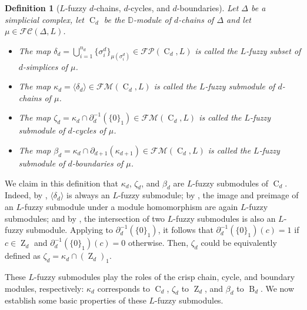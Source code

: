 \documentclass[a4paper,10pt]{article}
\newtheorem{definition}[theorem]{Definition}
\newcommand{\bbd}{\mathbb{D}}
\newcommand{\calfm}{\mathcal{F\!M}}
\newcommand{\calfp}{\mathcal{FP}}
\newcommand{\calfc}{\mathcal{FC}}
\DeclareMathOperator{\Co}{C}
\DeclareMathOperator{\Zo}{Z}
\DeclareMathOperator{\Bo}{B}
\begin{document}
\begin{definition}[\(L\)-fuzzy \(d\)-chains, \(d\)-cycles, and \(d\)-boundaries]
\label{def:chainsubmodules}
Let \(\Delta\) be a simplicial complex, let \(\Co_d\) be the \(\bbd\)-module of \(d\)-chains of \(\Delta\)
and let \(\mu \in \calfc(\Delta,L)\). 
\begin{itemize}
\item The map \(\delta_d = \bigcup_{i=1}^{n_d} \{\sigma^{d}_i\}_{\mu(\sigma^{d}_i)} \in \calfp(\Co_d,L)\) is called the \emph{\(L\)-fuzzy subset of \(d\)-simplices of \(\mu\)}.
\item The map \(\kappa_d = \langle \delta_d \rangle \in \calfm(\Co_d,L)\) is called the \emph{\(L\)-fuzzy submodule of \(d\)-chains of \(\mu\)}.
\item The map \(\zeta_d = \kappa_d \cap \partial_d^{-1}(\{0\}_1) \in \calfm(\Co_d,L)\) is called the \emph{\(L\)-fuzzy submodule of \(d\)-cycles of \(\mu\)}.
\item The map \(\beta_d = \kappa_d \cap \partial_{d+1}(\kappa_{d+1}) \in \calfm(\Co_d,L)\) is called the \emph{\(L\)-fuzzy submodule of \(d\)-boundaries of \(\mu\)}.
\end{itemize}
\end{definition}

We claim in this definition that \(\kappa_d\), \(\zeta_d\), and \(\beta_d\) are \(L\)-fuzzy submodules of \(\Co_d\). Indeed, by , \(\langle \delta_d\rangle\) is always an \(L\)-fuzzy submodule; by , the image and preimage of an \(L\)-fuzzy submodule under a module homomorphism are again \(L\)-fuzzy submodules; and by , the intersection of two \(L\)-fuzzy submodules is also an \(L\)-fuzzy submodule. 
Applying  to \(\partial_d^{-1}(\{0\}_1)\), it follows that \(\partial_d^{-1}(\{0\}_1)(c)=1\) if \(c \in \Zo_d\) and \(\partial_d^{-1}(\{0\}_1)(c)=0\) otherwise. Then, \(\zeta_d\) could be equivalently defined as \(\zeta_d = \kappa_d \cap (\Zo_d)_1\).

These \(L\)-fuzzy submodules play the roles of the crisp chain, cycle, and boundary modules, respectively: \(\kappa_d\) corresponds to \(\Co_d\), \(\zeta_d\) to \(\Zo_d\), and \(\beta_d\) to \(\Bo_d\). 
We now establish some basic properties of these \(L\)-fuzzy submodules.
\end{document}
